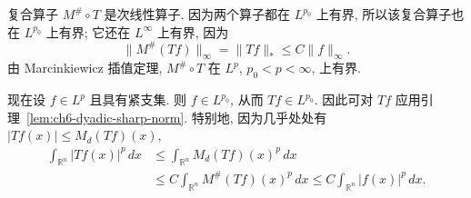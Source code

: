 \begin{Proof}
复合算子 $M^\#\circ T$ 是次线性算子. 因为两个算子都在 $L^{p_0}$ 上有界, 所以该复合算子也在 $L^{p_0}$ 上有界; 它还在 $L^\infty$ 上有界, 因为
\[
 \|M^\#(Tf)\|_\infty=\|Tf\|_*\le C\|f\|_\infty.
\]
由 Marcinkiewicz 插值定理, $M^\#\circ T$ 在 $L^p$, $p_0<p<\infty$, 上有界.

\hypertarget{chapter-06-page-135}{}
现在设 $f\in L^p$ 且具有紧支集. 则 $f\in L^{p_0}$, 从而 $Tf\in L^{p_0}$. 因此可对 $Tf$ 应用引理~\ref{lem:ch6-dyadic-sharp-norm}. 特别地, 因为几乎处处有 $|Tf(x)|\le M_d(Tf)(x)$,
\[
\begin{aligned}
 \int_{\mathbb R^n}|Tf(x)|^p\,dx
 &\le\int_{\mathbb R^n}M_d(Tf)(x)^p\,dx\\
 &\le C\int_{\mathbb R^n}M^\#(Tf)(x)^p\,dx
 \le C\int_{\mathbb R^n}|f(x)|^p\,dx.
\end{aligned}
\]
\end{Proof}
